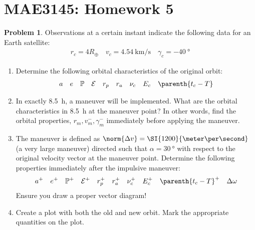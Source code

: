 \documentclass[10pt]{article}
\date{}
\theoremstyle{definition}
\newtheorem{prob}{Problem}[section]
\newenvironment{subprob}%
{\renewcommand{\theenumi}{\alph{enumi}}\renewcommand{\labelenumi}{(\theenumi)}\begin{enumerate}}%
{\end{enumerate}}%
\begin{document}
\setcounter{page}{1}
\pagestyle{plain}
\section*{MAE3145: Homework 5}
\vspace*{-0.4cm}

\begin{prob}
    Observations at a certain instant indicate the following data for an Earth satellite:
    \begin{align*}
        r_c = 4 R_{\oplus} \quad v_c = \SI{4.54}{\kilo\meter\per\second} \quad \gamma_c = \SI{-40}{\degree}
    \end{align*}
    
    \begin{subprob}
    \item Determine the following orbital characteristics of the original  orbit:
        \begin{align*}
        a \quad e \quad \mathbb{P} \quad \mathcal{E} \quad r_p \quad r_a \quad \nu_c \quad E_c \quad \parenth{t_c - T}
        \end{align*}
    \item In exactly \SI{8.5}{\hour}, a maneuver will be implemented.
        What are the orbital characteristics in \SI{8.5}{\hour} at the maneuver point? 
        In other words, find the orbital properties, \( r_m, v_m^{-}, \gamma_m^{-} \) immediately before applying the maneuver.
    \item The maneuver is defined as \( \norm{\Delta v} = \SI{1200}{\meter\per\second} \) (a very large maneuver) directed such that \( \alpha = \SI{30}{\degree} \) with respect to the original velocity vector at the maneuver point.
        Determine the following properties immediately after the impulsive maneuver:
        \begin{align*}
            a^{+} \quad e^{+} \quad \mathbb{P}^{+} \quad \mathcal{E}^{+} \quad r_p^{+} \quad r_a^{+} \quad \nu_c^{+} \quad E_c^{+} \quad \parenth{t_c - T}^{+} \quad \Delta \omega
        \end{align*}
        Ensure you draw a proper vector diagram!
    \item Create a plot with both the old and new orbit. 
        Mark the appropriate quantities on the plot.
    \end{subprob}
\end{prob}
\end{document}

